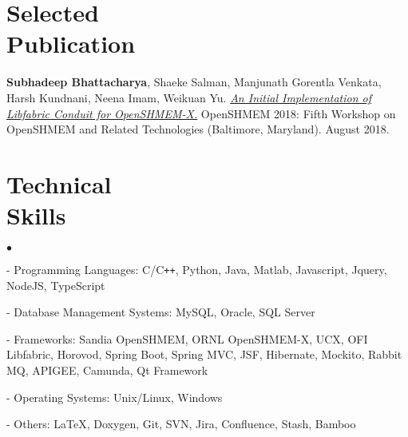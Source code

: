 \documentclass[margin,line]{res}
\newenvironment{list2}{
  \begin{list}{$\bullet$}{%
      \setlength{\itemsep}{0in}
      \setlength{\parsep}{0in} \setlength{\parskip}{0in}
      \setlength{\topsep}{0in} \setlength{\partopsep}{0in} 
      \setlength{\leftmargin}{0.2in}}}{\end{list}}
\begin{document}
\begin{resume}
\vspace*{-.18in}

\section{\sc Selected \\Publication}
{\bf Subhadeep Bhattacharya}, Shaeke Salman, Manjunath Gorentla Venkata, Harsh 
Kundnani, Neena Imam, Weikuan Yu. 
{\href{https://www.csm.ornl.gov/workshops/openshmem2018/presentations/openshmem18-paper5.pdf}{\textit{An
			Initial Implementation of Libfabric Conduit for OpenSHMEM-X.}}} 
OpenSHMEM 2018: 
Fifth Workshop on OpenSHMEM and Related Technologies (Baltimore, Maryland). 
August 2018.

\vspace*{-.18in}

\section{\sc Technical \\Skills}
\begin{list2}
	\item[ - ] Programming Languages: C/C\texttt{++}, Python, Java, Matlab, 
	Javascript, Jquery, NodeJS, TypeScript
	\item[ - ] Database Management Systems: MySQL, Oracle, SQL Server
	\item[ - ] Frameworks: Sandia OpenSHMEM, ORNL OpenSHMEM-X, UCX, OFI 
	Libfabric, 
	Horovod, Spring Boot, Spring MVC, JSF, Hibernate, 
	Mockito, Rabbit MQ, APIGEE, Camunda, Qt Framework
	\item[ - ] Operating Systems: Unix/Linux, Windows
	\item[ - ] Others: \LaTeX, Doxygen, Git, SVN, Jira, Confluence, Stash, 
	Bamboo
\end{list2}

\vspace*{-.18in}


\end{resume}
\end{document}
